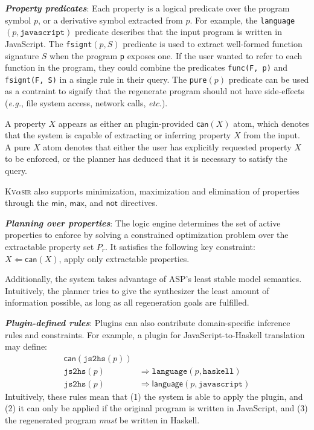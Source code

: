 \documentclass[nonacm,sigplan,review]{acmart}
\def\eg{{\em e.g.}, }
\def\etc{{\em etc.}\xspace}
\newcommand{\sys}{{\scshape Kv{$\alpha$}sir}\xspace}
\newcommand{\heading}[1]{\vspace{2pt}\noindent\textbf{\emph{#1}}:\enspace}
\newcommand{\ttt}[1]{\texttt{#1}\xspace}
\begin{document}



\heading{Property predicates}
Each property is a logical predicate over the program symbol $p$,
or a derivative symbol extracted from $p$.
For example, 
the \ttt{language}$(p, \ttt{javascript})$ predicate describes that the input program is written in JavaScript.
The \ttt{fsignt}$(p, S)$ predicate is used to extract well-formed function signature $S$ when the program \ttt{p} exposes one.
If the user wanted to refer to each function in the program, they could 
combine the predicates \ttt{func(F, p)} and \ttt{fsignt(F, S)} in a single rule in their query.
The \ttt{pure}$(p)$ predicate can be used as a contraint
to signify that the regenerate program
should not have side-effects (\eg file system access, network calls, \etc).

A property $X$ appears as either an
  plugin-provided $\mathsf{can}(X)$ atom, which denotes that the system is capable of extracting or inferring property $X$ from the input.
  A pure $X$ atom denotes that either the user has explicitly requested property $X$ to be enforced, or the planner has deduced that it is necessary to satisfy the query.

\sys also supports minimization, maximization and elimination of properties
through the $\mathsf{min}$, $\mathsf{max}$, and $\mathsf{not}$ directives.

\heading{Planning over properties}
The logic engine determines the set of active properties to enforce by solving
a constrained optimization problem over the extractable property set $P_r$.
It satisfies the
following key constraint:
  $X \Leftarrow \mathsf{can}(X)$, apply only extractable properties.

Additionally, the system takes advantage of ASP's least stable model semantics.
Intuitively, the planner tries to give the synthesizer the least amount of information
possible, as long as all regeneration goals are fulfilled.

\heading{Plugin-defined rules}
Plugins can also contribute domain-specific inference rules and constraints.
For example, a plugin for JavaScript-to-Haskell translation may define:
\begin{align*}
\mathsf{can}(\ttt{js2hs}(p)) & \\
\ttt{js2hs}(p) &\Rightarrow \ttt{language}(p, \ttt{haskell}) \\
\ttt{js2hs}(p) &\Rightarrow \mathsf{language}(p, \ttt{javascript})
\end{align*}
Intuitively, these rules mean that 
(1) the system is able to apply the plugin,
and (2) it can only be applied if the original program is written in JavaScript, 
and (3) the regenerated program \emph{must} be written in Haskell.
\end{document}

